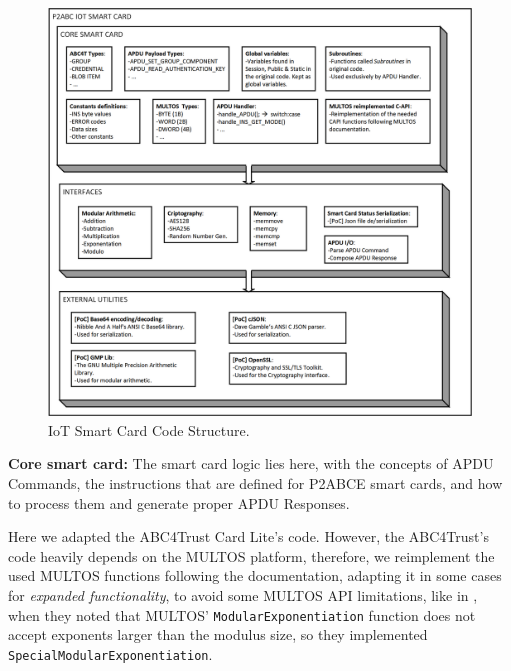 \documentclass[journal]{IEEEtran}
\begin{document}

\begin{figure}[bth]
	\begin{center}
		\includegraphics[width=\linewidth]{gfx/IoTCScomponents-bw}
	\end{center}
	\caption{IoT Smart Card Code Structure.}
	\label{fig:IoTCScomponents-bw}
\end{figure}


\hfil

\textbf{Core smart card:} The smart card logic lies here, with the concepts of APDU Commands, the instructions that are defined for P2ABCE smart cards, and how to process them and generate proper APDU Responses.

Here we adapted the ABC4Trust Card Lite's code. However, the ABC4Trust's code heavily depends on the MULTOS platform, therefore, we reimplement the used MULTOS functions following the documentation, adapting it in some cases for \textit{expanded functionality}, to avoid some MULTOS API limitations, like in \cite{vullers2013efficient}, when they noted that MULTOS' \texttt{ModularExponentiation}  function does not accept exponents larger than the modulus size, so they implemented \texttt{SpecialModularExponentiation}.
\end{document}
